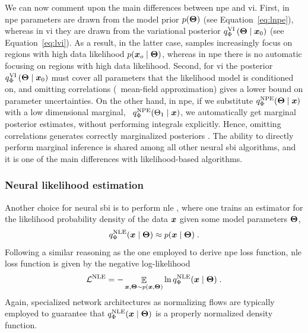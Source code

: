 We can now comment upon the main differences between \gls*{npe} and \gls*{vi}. First, in \gls*{npe} parameters are drawn from the model prior $p(\bm{\Theta})$ (see Equation~\eqref{eq:lnpe}), whereas in \gls*{vi} they are drawn from the variational posterior $q^\text{VI}_\Phi\left(\bm{\Theta} \mid \bm{x}_0\right)$ (see Equation~\eqref{eq:lvi}). As a result, in the latter case, samples increasingly focus on regions with high data likelihood $p(\bm{x}_o \mid \bm{\Theta})$, whereas in \gls*{npe} there is no  automatic focusing on regions with high data likelihood. Second, for \gls*{vi} the posterior  $q^\text{VI}_\Phi\left(\bm{\Theta} \mid \bm{x}_0\right)$ must cover all parameters that the likelihood model is conditioned on, and omitting correlations (\eg\ mean-field approximation) gives a lower bound on parameter uncertainties. On the other hand, in \gls*{npe}, if we substitute $q^\text{NPE}_\Phi(\bm{\Theta}\mid\bm{x})$ with a low dimensional marginal, \eg\ $q^\text{NPE}_\Phi(\Theta_1\mid\bm{x})$, we automatically get marginal posterior estimates, without performing integrals explicitly. Hence, omitting correlations generates correctly marginalized posteriors \cite{ambrogioni2019forward}. The ability to directly perform marginal inference is shared among all other neural \gls*{sbi} algorithms, and it is one of the main differences with likelihood-based algorithms. 


\subsubsection{Neural likelihood estimation}

Another choice for neural \gls*{sbi} is to perform {\gls*{nle}} \cite{Papamakarios:2018aa, Durkan:2018aa}, where one trains an estimator for the likelihood probability density of the data $\bm{x}$ given some model parameters $\bm{\Theta}$, 
\begin{equation}
    q^\text{NLE}_\Phi(\bm{x} \mid \bm{\Theta}) \approx p(\bm{x}\mid\bm{\Theta})\;.
\end{equation}
Following a similar reasoning as the one employed to derive \gls*{npe} loss function, \gls*{nle} loss function is given by the negative log-likelihood
%
\begin{equation}
	\mathcal{L}^\text{NLE}=-\mathop{\mathbb{E}}\limits_{\bm{x}, \bm{\Theta} \sim p(\bm{x}, \bm{\Theta})} \ln q^\text{NLE}_\Phi(\bm{x} \mid \bm{\Theta}) \;.
\end{equation}
%
Again, specialized network architectures as normalizing flows are typically employed to guarantee that $q^\text{NLE}_\Phi(\bm{x} \mid \bm{\Theta})$ is a properly normalized density function.


